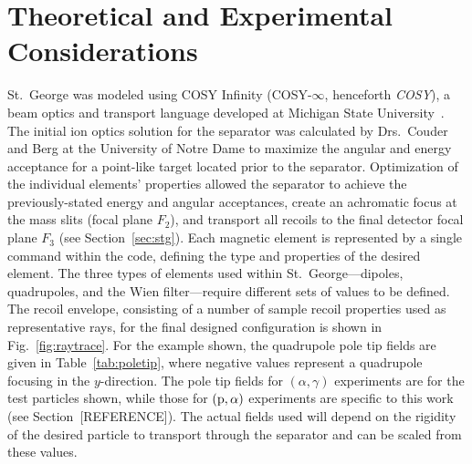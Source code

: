 \section{Theoretical and Experimental Considerations}
\label{sec:cosy}


St.\ George was modeled using COSY Infinity (COSY-$\infty$, henceforth
\emph{COSY}), a beam optics and transport language developed at Michigan
State University~\cite{COSY}. The initial ion optics solution for the
separator was calculated by Drs.\ Couder and Berg at the University of
Notre Dame to maximize the angular and energy acceptance for a
point-like target located prior to the separator. Optimization of the
individual elements' properties allowed the separator to achieve the
previously-stated energy and angular acceptances, create an achromatic
focus at the mass slits (focal plane $F_2$), and transport all recoils
to the final detector focal plane $F_3$ (see Section~\ref{sec:stg}).
Each magnetic element is represented by a single command within the
code, defining the type and properties of the desired element. The three
types of elements used within St.\ George\----{}dipoles, quadrupoles,
and the Wien filter\----{}require different sets of values to be
defined. The recoil envelope, consisting of a number of sample recoil
properties used as representative rays, for the final designed
configuration is shown in Fig.~\ref{fig:raytrace}. For the example
shown, the quadrupole pole tip fields are given in
Table~\ref{tab:poletip}, where negative values represent a quadrupole
focusing in the $y$-direction. The pole tip fields for $(\alpha,\gamma)$
experiments are for the test particles shown, while those for $({\rm
p},\alpha)$ experiments are specific to this work (see
Section~[REFERENCE]). The actual fields used will depend on the rigidity
of the desired particle to transport through the separator and can be
scaled from these values.

